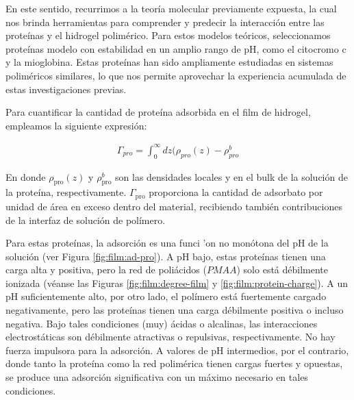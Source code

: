 En este sentido, recurrimos a la teor\'ia molecular previamente expuesta, la cual nos brinda herramientas para comprender y predecir la interacci\'on entre las prote\'inas y el hidrogel polim\'erico. Para estos  modelos te\'oricos, seleccionamos prote\'inas modelo con estabilidad en un amplio rango de pH, como el citocromo c y la mioglobina. Estas prote\'inas han sido ampliamente estudiadas en sistemas polim\'ericos similares, lo que nos permite aprovechar la experiencia acumulada de estas investigaciones previas.

Para cuantificar la cantidad de prote\'ina adsorbida en el film de hidrogel, empleamos la siguiente  expresi\'on:

\begin{align}
\Gamma_{pro} = \int^\infty_0 {dz(\rho_{pro}(z) -\rho^b_{pro}}  
\label{eq:film:adsor-exceso}
\end{align}


En donde $\rho_{\text{pro}}(z)$ y $\rho^b_{\text{pro}}$ son las densidades locales y en el bulk de la soluci\'on de la prote\'ina, respectivamente.
$\Gamma_{\text{pro}}$ proporciona la cantidad de adsorbato por unidad de \'area en exceso dentro del material, recibiendo tambi\'en contribuciones de la interfaz de soluci\'on de pol\'imero.

Para estas prote\'inas, la adsorci\'on es una funci
'on no mon\'otona del pH de la soluci\'on (ver Figura \ref{fig:film:ad-pro}). A pH bajo, estas prote\'inas tienen una carga alta y positiva, pero la red de poli\'acidos ($PMAA$) solo est\'a d\'ebilmente ionizada (v\'eanse las Figuras \ref{fig:film:degree-film} y \ref{fig:film:protein-charge}). A un pH suficientemente alto, por otro lado, el pol\'imero est\'a fuertemente cargado negativamente, pero las prote\'inas tienen una carga d\'ebilmente positiva o incluso negativa. Bajo tales condiciones (muy) \'acidas o alcalinas, las interacciones electrost\'aticas son d\'ebilmente atractivas o repulsivas, respectivamente. No hay fuerza impulsora para la adsorci\'on. A valores de pH intermedios, por el contrario, donde tanto la prote\'ina como la red polim\'erica tienen cargas fuertes y opuestas, se produce una adsorci\'on significativa con un m\'aximo necesario en tales condiciones.

